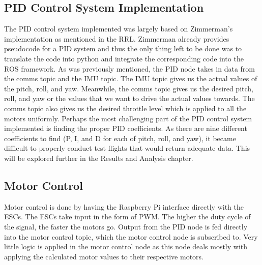 \documentclass[english]{upeeei}
\begin{document}
\subsection{PID Control System Implementation}
The PID control system implemented was largely based on Zimmerman's implementation as mentioned in the RRL. Zimmerman already provides pseudocode
for a PID system and thus the only thing left to be done was to translate the code into python and integrate the corresponding code into the ROS
framework. As was previously mentioned, the PID node takes in data from the comms topic and the IMU topic. The IMU topic gives us the actual values
of the pitch, roll, and yaw. Meanwhile, the comms topic gives us the desired pitch, roll, and yaw or the values that we want to drive the actual
values towards. The comms topic also gives us the desired throttle level which is applied to all the motors uniformly. Perhaps the most
challenging part of the PID control system implemented is finding the proper PID coefficients. As there are nine different coefficients to find
(P, I, and D for each of pitch, roll, and yaw), it became difficult to properly conduct test flights that would return adequate data. This will
be explored further in the Results and Analysis chapter.

\subsection{Motor Control}
Motor control is done by having the Raspberry Pi interface directly with the ESCs. The ESCs take input in the form of PWM. The higher the duty
cycle of the signal, the faster the motors go. Output from the PID node is fed directly into the motor control topic, which the motor control
node is subscribed to. Very little logic is applied in the motor control node as this node deals mostly with applying the calculated motor
values to their respective motors.
\end{document}

